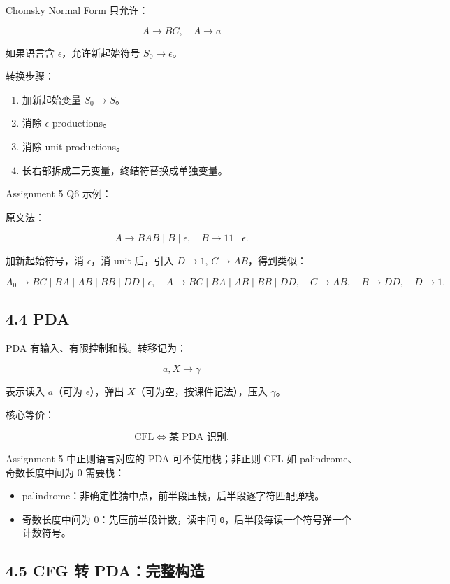 ﻿\documentclass[UTF8,11pt]{ctexart}
\begin{document}
Chomsky Normal Form 只允许：


\[
A\to BC,\quad A\to a
\]

如果语言含 \(\epsilon\)，允许新起始符号 \(S_0\to\epsilon\)。


转换步骤：


\begin{enumerate}
\item 加新起始变量 \(S_0\to S\)。
\item 消除 \(\epsilon\)-productions。
\item 消除 unit productions。
\item 长右部拆成二元变量，终结符替换成单独变量。
\end{enumerate}


Assignment 5 Q6 示例：


原文法：

\[
A\to BAB\mid B\mid\epsilon,\quad B\to11\mid\epsilon.
\]

加新起始符号，消 \(\epsilon\)，消 unit 后，引入 \(D\to1\), \(C\to AB\)，得到类似：

\[
A_0\to BC\mid BA\mid AB\mid BB\mid DD\mid\epsilon,
\quad A\to BC\mid BA\mid AB\mid BB\mid DD,
\quad C\to AB,\quad B\to DD,\quad D\to1.
\]


\subsection{4.4 PDA}


PDA 有输入、有限控制和栈。转移记为：

\[
a,X\to\gamma
\]

表示读入 \(a\)（可为 \(\epsilon\)），弹出 \(X\)（可为空，按课件记法），压入 \(\gamma\)。


核心等价：

\[
\text{CFL}\iff\text{某 PDA 识别}.
\]


Assignment 5 中正则语言对应的 PDA 可不使用栈；非正则 CFL 如 palindrome、奇数长度中间为 0 需要栈：


\begin{itemize}
\item palindrome：非确定性猜中点，前半段压栈，后半段逐字符匹配弹栈。
\item 奇数长度中间为 0：先压前半段计数，读中间 \texttt{0}，后半段每读一个符号弹一个计数符号。
\end{itemize}


\subsection{4.5 CFG 转 PDA：完整构造}
\end{document}
